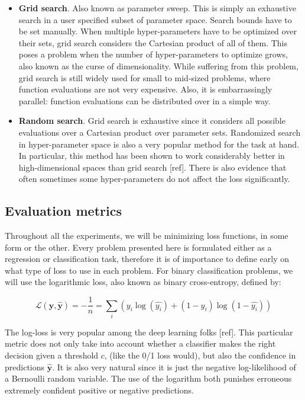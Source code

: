 \documentclass[10pt,a4paper,twoside]{book}
\begin{document}
\begin{itemize}
	\item \textbf{Grid search}. Also known as parameter sweep. This is simply an exhaustive search in a user specified subset of parameter space. Search bounds have to be set manually. When multiple hyper-parameters have to be optimized over their sets, grid search considers the Cartesian product of all of them. This poses a problem when the number of hyper-parameters to optimize grows, also known as the curse of dimensionality. While suffering from this problem, grid search is still widely used for small to mid-sized problems, where function evaluations are not very expensive. Also, it is embarrassingly parallel: function evaluations can be distributed over in a simple way.
	\item \textbf{Random search}. Grid search is exhaustive since it considers all possible evaluations over a Cartesian product over parameter sets. Randomized search in hyper-parameter space is also a very popular method for the task at hand. In particular, this method has been shown to work considerably better in high-dimensional spaces than grid search [ref]. There is also evidence that often sometimes some hyper-parameters do not affect the loss significantly.
\end{itemize}

\subsection{Evaluation metrics}
\label{evaluation}

Throughout all the experiments, we will be minimizing loss functions, in some form or the other. Every problem presented here is formulated either as a regression or classification task, therefore it is of importance to define early on what type of loss to use in each problem. For binary classification problems, we will use the logarithmic loss, also known as binary cross-entropy, defined by:

\begin{equation}
\mathcal{L}(\boldsymbol{y}, \boldsymbol{\hat{y}}) = -\dfrac{1}{n} = \sum_i \left(y_i \log(\hat{y_i}) + (1 - y_i)\log(1-\hat{y_i})\right)
\end{equation}

The log-loss is very popular among the deep learning folks [ref]. This particular metric does not only take into account whether a classifier makes the right decision given a threshold $c$, (like the 0/1 loss would), but also the confidence in predictions $\boldsymbol{\hat{y}}$. It is also very natural since it is just the negative log-likelihood of a Bernoulli random variable. The use of the logarithm both punishes erroneous extremely confident positive or negative predictions.\\
\end{document}
